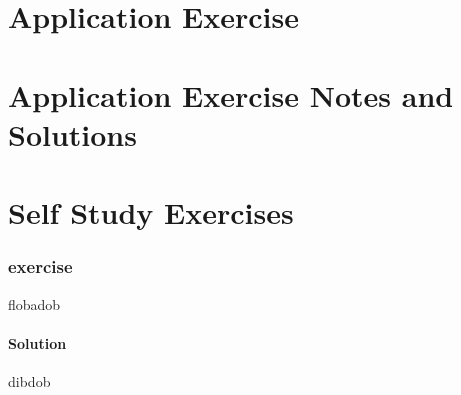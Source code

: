 \documentclass[twoside=false, DIV=14]{scrartcl}
\begin{document}
\newpage
\part*{Application Exercise}

\newpage
\part*{Application Exercise Notes and Solutions}

\newpage
\part*{Self Study Exercises}
\section*{exercise}
flobadob

\subsection*{Solution}
dibdob
\end{document}
